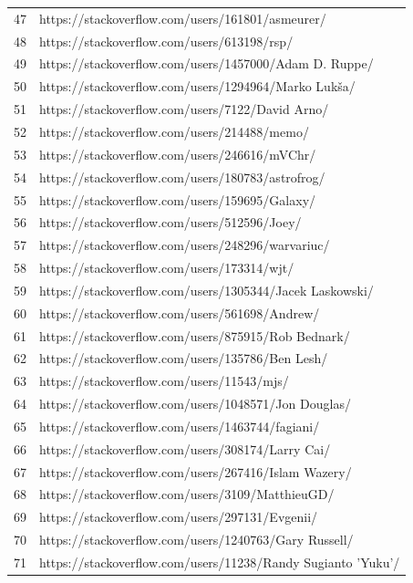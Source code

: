 \begin{center}
\begin{longtable}{|p{1.5cm}|p{12.5cm}|}
        47 & https://stackoverflow.com/users/161801/asmeurer/ \\
        48 & https://stackoverflow.com/users/613198/rsp/ \\
        49 & https://stackoverflow.com/users/1457000/Adam D. Ruppe/ \\
        50 & https://stackoverflow.com/users/1294964/Marko Lukša/ \\
        51 & https://stackoverflow.com/users/7122/David Arno/ \\
        52 & https://stackoverflow.com/users/214488/memo/ \\
        53 & https://stackoverflow.com/users/246616/mVChr/ \\
        54 & https://stackoverflow.com/users/180783/astrofrog/ \\
        55 & https://stackoverflow.com/users/159695/Galaxy/ \\
        56 & https://stackoverflow.com/users/512596/Joey/ \\
        57 & https://stackoverflow.com/users/248296/warvariuc/ \\
        58 & https://stackoverflow.com/users/173314/wjt/ \\
        59 & https://stackoverflow.com/users/1305344/Jacek Laskowski/ \\
        60 & https://stackoverflow.com/users/561698/Andrew/ \\
        61 & https://stackoverflow.com/users/875915/Rob Bednark/ \\
        62 & https://stackoverflow.com/users/135786/Ben Lesh/ \\
        63 & https://stackoverflow.com/users/11543/mjs/ \\
        64 & https://stackoverflow.com/users/1048571/Jon Douglas/ \\
        65 & https://stackoverflow.com/users/1463744/fagiani/ \\
        66 & https://stackoverflow.com/users/308174/Larry Cai/ \\
        67 & https://stackoverflow.com/users/267416/Islam Wazery/ \\
        68 & https://stackoverflow.com/users/3109/MatthieuGD/ \\
        69 & https://stackoverflow.com/users/297131/Evgenii/ \\
        70 & https://stackoverflow.com/users/1240763/Gary Russell/ \\
        71 & https://stackoverflow.com/users/11238/Randy Sugianto 'Yuku'/ \\

\end{longtable}
\end{center}
